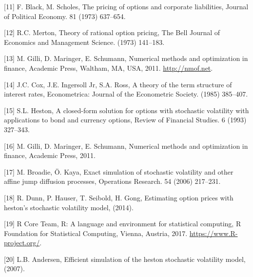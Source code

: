 \documentclass[12pt,twoside]{reedthesis}
\theoremstyle{definition}
\theoremstyle{definition}
\theoremstyle{remark}
\begin{document}
  \hypertarget{ref-black1973pricing}{}
  {[}11{]} F. Black, M. Scholes, The pricing of options and corporate
  liabilities, Journal of Political Economy. 81 (1973) 637--654.
  
  \hypertarget{ref-merton1973theory}{}
  {[}12{]} R.C. Merton, Theory of rational option pricing, The Bell
  Journal of Economics and Management Science. (1973) 141--183.
  
  \hypertarget{ref-nmof}{}
  {[}13{]} M. Gilli, D. Maringer, E. Schumann, Numerical methods and
  optimization in finance, Academic Press, Waltham, MA, USA, 2011.
  \url{http://nmof.net}.
  
  \hypertarget{ref-cox1985theory}{}
  {[}14{]} J.C. Cox, J.E. Ingersoll Jr, S.A. Ross, A theory of the term
  structure of interest rates, Econometrica: Journal of the Econometric
  Society. (1985) 385--407.
  
  \hypertarget{ref-heston1993closed}{}
  {[}15{]} S.L. Heston, A closed-form solution for options with stochastic
  volatility with applications to bond and currency options, Review of
  Financial Studies. 6 (1993) 327--343.
  
  \hypertarget{ref-gilli_numerical_2011}{}
  {[}16{]} M. Gilli, D. Maringer, E. Schumann, Numerical methods and
  optimization in finance, Academic Press, 2011.
  
  \hypertarget{ref-broadie2006exact}{}
  {[}17{]} M. Broadie, Ö. Kaya, Exact simulation of stochastic volatility
  and other affine jump diffusion processes, Operations Research. 54
  (2006) 217--231.
  
  \hypertarget{ref-dunn2014estimating}{}
  {[}18{]} R. Dunn, P. Hauser, T. Seibold, H. Gong, Estimating option
  prices with heston's stochastic volatility model, (2014).
  
  \hypertarget{ref-rlang}{}
  {[}19{]} R Core Team, R: A language and environment for statistical
  computing, R Foundation for Statistical Computing, Vienna, Austria,
  2017. \url{https://www.R-project.org/}.
  
  \hypertarget{ref-andersen2007efficient}{}
  {[}20{]} L.B. Andersen, Efficient simulation of the heston stochastic
  volatility model, (2007).


\end{document}
